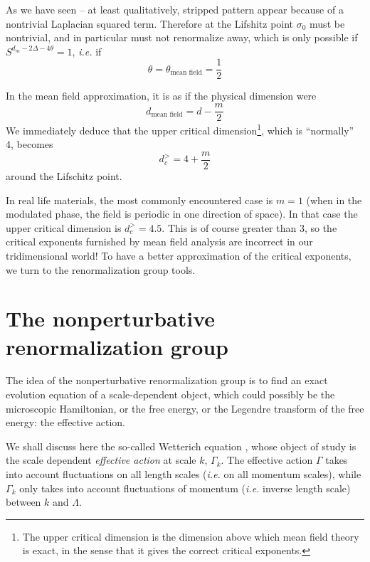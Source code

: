 As we have seen -- at least qualitatively, stripped pattern appear because of a nontrivial Laplacian squared term. Therefore at the Lifshitz point $\sigma_0$ must be nontrivial, and in particular must not renormalize away, which is only possible if $S^{d_m -2\Delta - 4 \theta} = 1$, \textit{i.e.} if
\begin{equation}
\theta =  \theta_{\text{mean field}}=  \frac{1}{2}
\end{equation}

In the mean field approximation, it is as if the physical dimension were
\begin{equation}
d_{\text{mean field}} = d - \frac{m}{2}
\end{equation}
We immediately deduce that the upper critical dimension\footnote{The upper critical dimension is the dimension above which mean field theory is exact, in the sense that it gives the correct critical exponents.}, which is ``normally'' 4, becomes
\begin{equation}
d_c^> = 4 + \frac{m}{2}
\end{equation}
around the Lifschitz point.

In real life materials, the most commonly encountered case is $m=1$ (when in the modulated phase, the field is periodic in one direction of space). In that case the upper critical dimension is $d_c^> = 4.5$. This is of course greater than $3$, so the critical exponents furnished by mean field analysis are incorrect in our tridimensional world! To have a better approximation of the critical exponents, we turn to the renormalization group tools.

\section{The nonperturbative renormalization group}

The idea of the nonperturbative renormalization group is to find an exact evolution equation of a scale-dependent object, which could possibly be the microscopic Hamiltonian, or the free energy, or the Legendre transform of the free energy: the effective action. 

We shall discuss here the so-called Wetterich equation \cite{Wetterich}, whose object of study is the scale dependent \textit{effective action} at scale $k$,  $\Gamma_k$. The effective action $\Gamma$ takes into account fluctuations on all length scales (\textit{i.e.} on all momentum scales), while $\Gamma_k$ only takes into account fluctuations of momentum (\textit{i.e.} inverse length scale) between $k$ and $\Lambda$.

